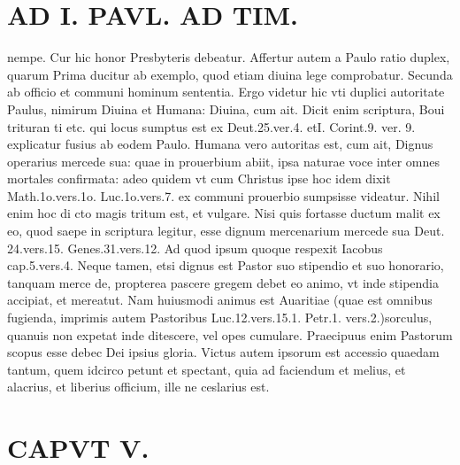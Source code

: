 \documentclass{article}
\begin{document}
\begin{pages}
\section*{AD I. PAVL. AD TIM. }
\marginpar{[ p.310 ]}\pstart nempe. Cur hic honor Presbyteris debeatur. Affertur autem a Paulo ratio duplex, quarum Prima ducitur ab exemplo, quod etiam diuina lege comprobatur. Secunda ab officio et communi hominum sententia. Ergo videtur hic vti duplici autoritate Paulus, nimirum Diuina et Humana: Diuina, cum ait. Dicit enim scriptura, Boui trituran ti etc. qui locus sumptus est ex Deut.25.ver.4. etI. Corint.9. ver. 9. explicatur fusius ab eodem Paulo. Humana vero autoritas est, cum ait, Dignus operarius mercede sua: quae in prouerbium abiit, ipsa naturae voce inter omnes mortales confirmata: adeo quidem vt cum Christus ipse hoc idem dixit Math.1o.vers.1o. Luc.1o.vers.7. ex communi prouerbio sumpsisse videatur. Nihil enim hoc di cto magis tritum est, et vulgare. Nisi quis fortasse ductum malit ex eo, quod saepe in scriptura legitur, esse dignum mercenarium mercede sua Deut. 24.vers.15. Genes.31.vers.12. Ad quod ipsum quoque respexit Iacobus cap.5.vers.4. Neque tamen, etsi dignus est Pastor suo stipendio et suo honorario, tanquam merce de, propterea pascere gregem debet eo animo, vt inde stipendia accipiat, et mereatut. Nam huiusmodi animus est Auaritiae (quae est omnibus fugienda, imprimis autem Pastoribus Luc.12.vers.15.1. Petr.1. vers.2.)sorculus, quanuis non expetat inde ditescere, vel opes cumulare. Praecipuus enim Pastorum scopus esse debec Dei ipsius gloria. Victus autem ipsorum est accessio quaedam tantum, quem idcirco petunt et spectant, quia ad faciendum et melius, et alacrius, et liberius officium, ille ne ceslarius est.  \pend
\section*{CAPVT V. }
\marginpar{[ p.311 ]}\pstart {}
{}

\end{pages}
\end{document}
